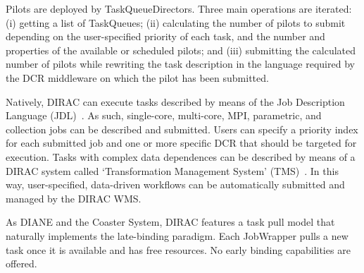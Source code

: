 \documentclass{sig-alternate}
\begin{document}
Pilots are deployed by TaskQueueDirectors. Three main operations are iterated:
(i) getting a list of TaskQueues; (ii) calculating the number of pilots to
submit depending on the user-specified priority of each task, and the number and
properties of the available or scheduled pilots; and (iii) submitting the
calculated number of pilots while rewriting the task description in the language
required by the DCR middleware on which the pilot has been submitted.

Natively, DIRAC can execute tasks described by means of the Job Description
Language (JDL)~\cite{pacini2006job}. As such, single-core, multi-core, MPI,
parametric, and collection jobs can be described and submitted. Users can
specify a priority index for each submitted job and one or more specific DCR
that should be targeted for execution. Tasks with complex data dependences can
be described by means of a DIRAC system called `Transformation Management
System' (TMS)~\cite{tsaregorodtsev2006dirac}. In this way, user-specified,
data-driven workflows can be automatically submitted and managed by the DIRAC
WMS.

As DIANE and the Coaster System, DIRAC features a task pull model that naturally
implements the late-binding paradigm. Each JobWrapper pulls a new task once it
is available and has free resources. No early binding capabilities are offered.

%




\end{document}
